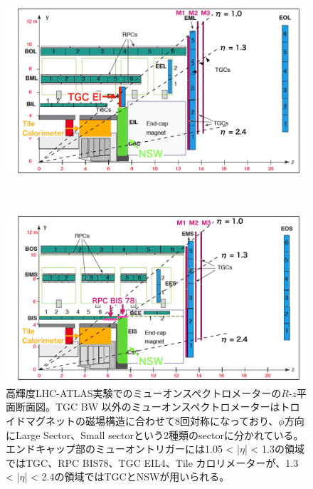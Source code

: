 \begin{figure}
\begin{minipage}[b]{1.0\linewidth}
\centering
\includegraphics[width=16cm]{fig/Intro/MuonSpe_Large.pdf}
\end{minipage}\\
\begin{minipage}[b]{1.0\linewidth}
\centering
\includegraphics[width=16cm]{fig/Intro/MuonSpe_small.pdf}
\end{minipage}%
\caption[高輝度LHC-ATLAS実験でのミューオンスペクトロメーターの$R$-$z$平面断面図]{高輝度LHC-ATLAS実験でのミューオンスペクトロメーターの$R$-$z$平面断面図\cite{tdr_phase2muon_2017017}。TGC BW 以外のミューオンスペクトロメーターはトロイドマグネットの磁場構造に合わせて8回対称になっており、$\phi$方向にLarge Sector、Small sectorという2種類のsectorに分かれている。エンドキャップ部のミューオントリガーには1.05 < |$\eta$| < 1.3の領域ではTGC、RPC BIS78、TGC EIL4、Tile カロリメーターが、1.3 < |$\eta$| < 2.4の領域ではTGCとNSWが用いられる。}
\label{Muonspectrometer2}
\end{figure}


